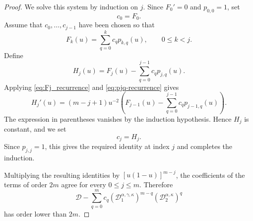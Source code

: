 \documentclass[10pt,a4paper]{amsart}
\begin{document}
\begin{proof}
We solve this system by induction on \(j\). Since \(F_0'=0\) and
\(p_{0,0}=1\), set
\[
c_0=F_0.
\]
Assume that \(c_0,\ldots,c_{j-1}\) have been chosen so that
\[
F_k(u)
=
\sum_{q=0}^{k}c_qp_{k,q}(u),
\qquad 0\le k<j.
\]
Define
\[
H_j(u)
=
F_j(u)
-
\sum_{q=0}^{j-1}c_qp_{j,q}(u).
\]
Applying \eqref{eq:Fj_recurrence} and \eqref{eq:pjq-recurrence} gives
\[
H_j'(u)
=
(m-j+1)u^{-2}
\left(
F_{j-1}(u)
-
\sum_{q=0}^{j-1}c_qp_{j-1,q}(u)
\right).
\]
The expression in parentheses vanishes by the induction hypothesis.
Hence \(H_j\) is constant, and we set
\[
c_j=H_j.
\]
Since \(p_{j,j}=1\), this gives the required identity at index \(j\) and
completes the induction.

Multiplying the resulting identities by \([u(1-u)]^{m-j}\), the
coefficients of the terms of order \(2m\) agree for every
\(0\leq j\leq m\). Therefore
\[
\mathcal D
-
\sum_{q=0}^{m}
c_q
\left(\mathcal D_1^{\alpha,\gamma,\kappa}\right)^{m-q}
\left(\mathcal D_2^{\alpha,\kappa}\right)^q
\]
has order lower than \(2m\).
\end{proof}
\end{document}
